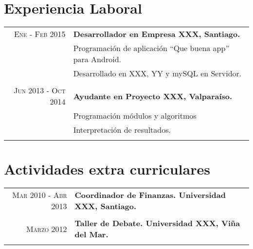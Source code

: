 \documentclass[a4paper,11pt]{article} %
\begin{document}
\section{Experiencia Laboral}
\begin{tabular}{r|p{11cm}}
\textsc{Ene - Feb 2015} & \textbf{Desarrollador en Empresa XXX, Santiago.}\emph{}\\
& \footnotesize{Programación de aplicación ``Que buena app'' para Android.}\\
& \footnotesize{Desarrollado en XXX, YY y mySQL en Servidor.}\\
\multicolumn{2}{c}{} \\
\textsc{Jun 2013 - Oct 2014} & \textbf{Ayudante en Proyecto XXX, Valparaíso.}\\
& \footnotesize{Programación módulos y algoritmos}\\
& \footnotesize{Interpretación de resultados.}\\
\multicolumn{2}{c}{} \\

\end{tabular}


\section{Actividades extra curriculares}
\begin{tabular}{r|p{11cm}}
\textsc{Mar 2010 - Abr 2013} & \textbf{Coordinador de Finanzas. Universidad XXX, Santiago.}\\ 
\multicolumn{2}{c}{} \\
\textsc{Marzo 2012} & \textbf{Taller de Debate. Universidad XXX, Viña del Mar.}\\ 
\multicolumn{2}{c}{}\\
\end{tabular}

\end{document}
